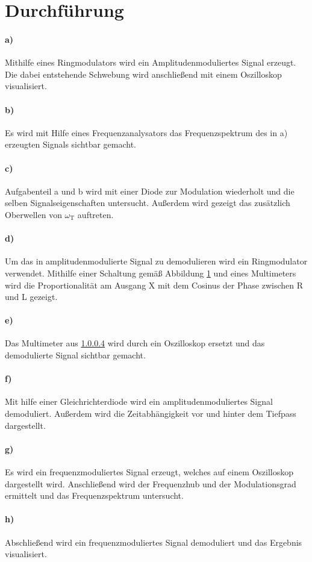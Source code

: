 \section{Durchführung}

\paragraph{a)}
\label{par:a}
Mithilfe eines Ringmodulators wird ein Amplitudenmoduliertes Signal erzeugt. Die dabei entstehende Schwebung wird anschließend mit einem
Oszilloskop visualisiert.

\paragraph{b)}
\label{par:b}
Es wird mit Hilfe eines Frequenzanalysators das Frequenzspektrum des in a) erzeugten Signals sichtbar gemacht.

\paragraph{c)}
\label{par:c}
Aufgabenteil a und b wird mit einer Diode zur Modulation wiederholt und die selben Signalseigenschaften untersucht.
Außerdem wird gezeigt das zusätzlich Oberwellen von $\omega_\text{T}$ auftreten.

\paragraph{d)}
\label{par:d}
Um das in amplitudenmodulierte Signal zu demodulieren wird ein Ringmodulator verwendet.
Mithilfe einer Schaltung gemäß Abbildung \ref{} und eines Multimeters wird die Proportionalität am Ausgang X mit dem Cosinus der Phase zwischen R und L gezeigt.

\paragraph{e)}
\label{par:e}
Das Multimeter aus \ref{par:d} wird durch ein Oszilloskop ersetzt und das demodulierte Signal sichtbar gemacht.

\paragraph{f)}
\label{par:f}
Mit hilfe einer Gleichrichterdiode wird ein amplitudenmoduliertes Signal demoduliert.
Außerdem wird die Zeitabhängigkeit vor und hinter dem Tiefpass dargestellt.

\paragraph{g)}
\label{par:g}
Es wird ein frequenzmoduliertes Signal erzeugt, welches auf einem Oszilloskop dargestellt wird. Anschließend wird der Frequenzhub und
der Modulationsgrad ermittelt und das Frequenzspektrum untersucht.

\paragraph{h)}
\label{par:h}
Abschließend wird ein frequenzmoduliertes Signal demoduliert und das Ergebnis visualisiert.